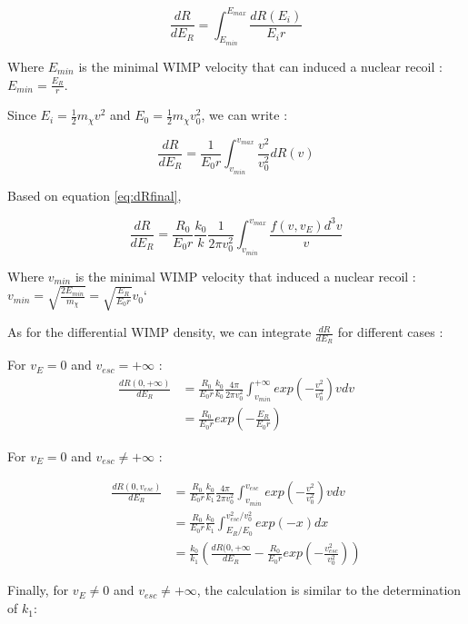 \documentclass[a4paper, twoside, openany, 11pt]{book}
\begin{document}
\begin{equation}
\frac{dR}{dE_R}= \int_{E_{min}}^{E_{max}} \frac{dR(E_i)}{E_i r}
\end{equation}

Where $E_{min}$ is the minimal WIMP velocity that can induced a nuclear recoil : $E_{min} =\frac{E_R}{r}$.

\medskip
Since $ E_i = \frac{1}{2} m_\chi v^2 $  and  $ E_0 = \frac{1}{2} m_\chi v_0^2 $, we can write : 

\begin{equation*}
\frac{dR}{dE_R}= \frac{1}{E_0 r}\int_{v_{min}}^{v_{max}} \frac{v^2}{v_0^2} dR(v)
\end{equation*}

Based on equation \ref{eq:dRfinal}, 

\begin{equation}
\frac{dR}{dE_R}= \frac{R_0}{E_0 r} \frac{k_0}{k} \frac{1}{2 \pi v_0 ^2} \int_{v_{min}}^{v_{max}}\frac{f(v,v_E) d^3v}{v}
\end{equation}

Where $v_{min}$ is the minimal WIMP velocity that induced a nuclear recoil : $ v_{min} = \sqrt{\frac{2E_{min}}{m_{\chi}}} = \sqrt{\frac{E_R}{E_0 r}} v_0 $`

\medskip
As for the differential WIMP density, we can integrate $\frac{dR}{dE_R}$ for different cases : 

For $v_E = 0$ and $v_{esc} = + \infty $ : 
\begin{align*}
\frac{dR(0,+\infty)}{dE_R}&= \frac{R_0}{E_0 r} \frac{k_0}{k_0} \frac{4 \pi}{2 \pi v_0 ^2} \int_{v_{min}}^{+ \infty} exp(- \frac{v^2}{v_0 ^2}) v dv \\
&= \frac{R_0}{E_0 r} exp(-\frac{E_R}{E_0 r})
\end{align*}


For $v_E = 0$ and $v_{esc} \neq + \infty $ : 
 
\begin{align*}
\frac{dR(0,v_{esc})}{dE_R}&= \frac{R_0}{E_0 r} \frac{k_0}{k_1} \frac{4 \pi}{2 \pi v_0 ^2} \int_{v_{min}}^{v_{esc}} exp(- \frac{v^2}{v_0 ^2}) v dv \\
&= \frac{R_0}{E_0 r} \frac{k_0}{k_1} \int_{E_R/E_0}^{v_{esc}^2/v_0^2} exp(-x) dx \\
&= \frac{k_0}{k_1} ( \frac{dR(0,+\infty}{dE_R} -  \frac{R_0}{E_0 r}  exp(-\frac{v_{esc}^2}{v_0^2}))
\end{align*}

Finally, for $v_E \neq 0$ and $v_{esc} \neq + \infty $, the calculation is similar to the determination of $k_1$: 
\end{document}

